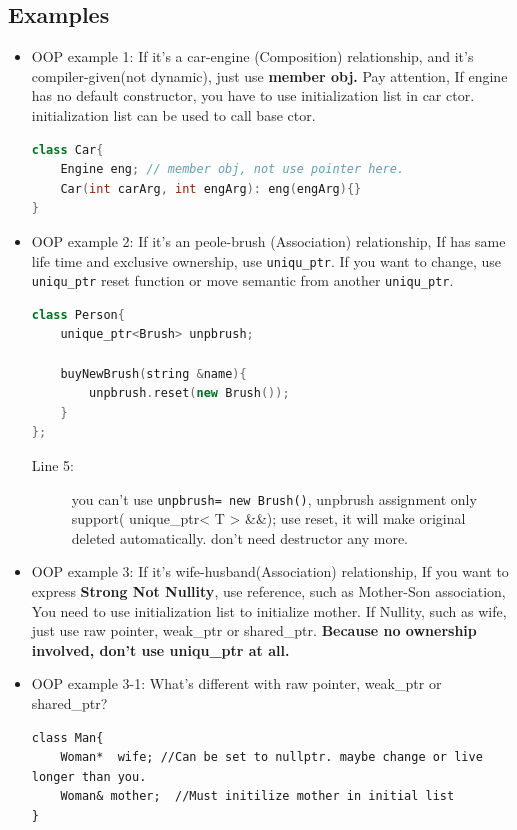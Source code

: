 \documentclass[a4paper,11pt,twoside]{book}
\begin{document}
\subsection{Examples}
\begin{itemize}
	\item OOP example 1: If it's a car-engine (Composition) relationship, and it's compiler-given(not dynamic), just use \textbf{member obj.}   Pay attention, If engine has no default constructor, you have to use initialization list in car ctor.  initialization list can be used to call base ctor.
\begin{lstlisting}[frame=single, language=c++]
class Car{
	Engine eng; // member obj, not use pointer here.
	Car(int carArg, int engArg): eng(engArg){}
}
	\end{lstlisting}
	
	
	\item OOP example 2:  If it's an peole-brush (Association) relationship, If has same life time and exclusive ownership, use \texttt{uniqu\_ptr}. If you want to change, use \texttt{uniqu\_ptr} reset function or move semantic from another \texttt{uniqu\_ptr}.
\begin{lstlisting}[frame=single, language=c++]
class Person{
	unique_ptr<Brush> unpbrush;
	
	buyNewBrush(string &name){
		unpbrush.reset(new Brush());
	}
};
\end{lstlisting}
\begin{description}
	\item[Line 5:] you can't use \texttt{unpbrush= new Brush()}, unpbrush assignment only support( unique\_ptr< T > \&\&); use reset, it will make original deleted automatically. don't need destructor any more.
\end{description}
	
	\item OOP example 3: If it's wife-husband(Association) relationship, If you want to express \textbf{Strong Not Nullity}, use reference, such as Mother-Son association, You need to use initialization list to initialize mother. If Nullity, such as wife, just use raw pointer, weak\_ptr or shared\_ptr. \textbf{Because no ownership involved, don't use uniqu\_ptr at all. }
	
	\item OOP example 3-1: What's different with raw pointer, weak\_ptr or shared\_ptr?
	\begin{lstlisting}[]
class Man{
	Woman*  wife; //Can be set to nullptr. maybe change or live longer than you.
	Woman& mother;  //Must initilize mother in initial list
}
\end{lstlisting}


\end{itemize}
\end{document}
